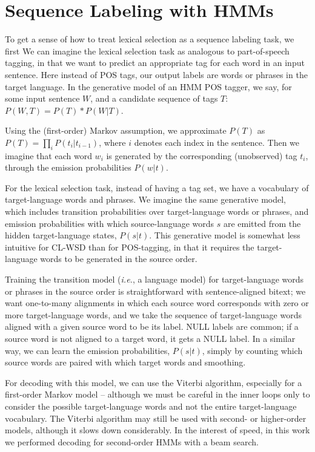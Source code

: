 \documentclass[11pt]{article}
\begin{document}
\section{Sequence Labeling with HMMs}
To get a sense of how to treat lexical selection as a sequence labeling task,
we first 
We can imagine the lexical selection task as analogous to part-of-speech
tagging, in that we want to predict an appropriate tag for each word in an
input sentence. Here instead of POS tags, our output labels are words or
phrases in the target language. In the generative model of an HMM POS tagger,
we say, for some input sentence $W$, and a candidate sequence of tags $T$:
$ P(W, T) = P(T) * P(W|T) $.

Using the (first-order) Markov assumption, we approximate $P(T)$ as 
$P(T) = \prod_{i} P(t_i | t_{i-1})$, where $i$ denotes each index in the
sentence. Then we imagine that each word $w_i$ is generated by the
corresponding (unobserved) tag $t_i$, through the emission probabilities
$P(w|t)$.

For the lexical selection task, instead of having a tag set, we have a
vocabulary of target-language words and phrases. We imagine the same generative
model, which includes transition probabilities over target-language words or
phrases, and emission probabilities with which source-language words $s$ are
emitted from the hidden target-language states, $P(s|t)$. This generative model
is somewhat less intuitive for CL-WSD than for POS-tagging, in that it requires
the target-language words to be generated in the source order.

Training the transition model (\textit{i.e.}, a language model) for
target-language words or phrases in the source order is straightforward with
sentence-aligned bitext; we want one-to-many alignments in which each source
word corresponds with zero or more target-language words, and we take the
sequence of target-language words aligned with a given source word to be its
label. NULL labels are common; if a source word is not aligned to a target
word, it gets a NULL label. In a similar way, we can learn the emission
probabilities, $P(s|t)$, simply by counting which source words are paired with
which target words and smoothing.

For decoding with this model, we can use the Viterbi algorithm, especially for
a first-order Markov model -- although we must be careful in the inner loops
only to consider the possible target-language words and not the entire
target-language vocabulary. The Viterbi algorithm may still be used with
second- or higher-order models, although it slows down considerably. In the
interest of speed, in this work we performed decoding for second-order HMMs
with a beam search.
\end{document}
